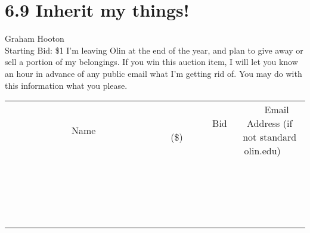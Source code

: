 \documentclass[11pt]{article}
\begin{document}
\section*{6.9 Inherit my things!}
Graham Hooton
\\
Starting Bid: \$1
\newline
I'm leaving Olin at the end of the year, and plan to give away or sell a portion of my belongings. If you win this auction item, I will let you know an hour in advance of any public email what I'm getting rid of. You may do with this information what you please.
\\[3ex]
\begin{tabular}{c c c}
~~~~~~~~~~~~~Name~~~~~~~~~~~~~ & ~~~~~~~~~Bid (\$)~~~~~~~~~  & ~~~Email Address (if not standard olin.edu)~~~\\
 & & \\
\hline
 & & \\
\hline
 & & \\
\hline
 & & \\
\hline
 & & \\
\hline
 & & \\
\hline
 & & \\
\hline
 & & \\
\hline
 & & \\
\hline
 & & \\
\hline
 & & \\
\hline
 & & \\
\hline
 & & \\
\hline
 & & \\
\hline
 & & \\
\hline
 & & \\
\hline
 & & \\
\hline
 & & \\
\hline
 & & \\
\hline
\end{tabular}
\newpage
\end{document}
